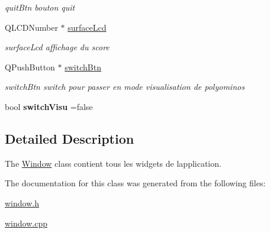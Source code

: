 \begin{DoxyCompactItemize}
\begin{DoxyCompactList}\small\item\em quit\+Btn bouton quit \end{DoxyCompactList}\item 
Q\+L\+C\+D\+Number $\ast$ \hyperlink{class_window_a35b1d4ab7d60ceff7daa5d817314226c}{surface\+Lcd}\hypertarget{class_window_a35b1d4ab7d60ceff7daa5d817314226c}{}\label{class_window_a35b1d4ab7d60ceff7daa5d817314226c}

\begin{DoxyCompactList}\small\item\em surface\+Lcd affichage du score \end{DoxyCompactList}\item 
Q\+Push\+Button $\ast$ \hyperlink{class_window_af958997387b1124f1bf2b47b7230db74}{switch\+Btn}\hypertarget{class_window_af958997387b1124f1bf2b47b7230db74}{}\label{class_window_af958997387b1124f1bf2b47b7230db74}

\begin{DoxyCompactList}\small\item\em switch\+Btn switch pour passer en mode visualisation de polyominos \end{DoxyCompactList}\item 
bool {\bfseries switch\+Visu} =false\hypertarget{class_window_aeb85a2399e59772014289c10440d401a}{}\label{class_window_aeb85a2399e59772014289c10440d401a}

\end{DoxyCompactItemize}


\subsection{Detailed Description}
The \hyperlink{class_window}{Window} class contient tous les widgets de l\textquotesingle{}application. 

The documentation for this class was generated from the following files\+:\begin{DoxyCompactItemize}
\item 
\hyperlink{window_8h}{window.\+h}\item 
\hyperlink{window_8cpp}{window.\+cpp}\end{DoxyCompactItemize}
